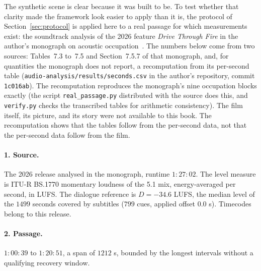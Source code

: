 The synthetic scene is clear because it was built to be. To test whether that clarity made the framework look easier to apply than it is, the protocol of Section~\ref{sec:protocol} is applied here to a real passage for which measurements exist: the soundtrack analysis of the 2026 feature \emph{Drive Through Fire} in the author's monograph on acoustic occupation~\cite{flyxion2026occupation}. The numbers below come from two sources: Tables~7.3 to~7.5 and Section~7.5.7 of that monograph, and, for quantities the monograph does not report, a recomputation from its per-second table (\texttt{audio-analysis/results/seconds.csv} in the author's repository, commit \texttt{1c016ab}). The recomputation reproduces the monograph's nine occupation blocks exactly (the script \texttt{real\_passage.py} distributed with the source does this, and \texttt{verify.py} checks the transcribed tables for arithmetic consistency). The film itself, its picture, and its story were not available to this book. The recomputation shows that the tables follow from the per-second data, not that the per-second data follow from the film.

\paragraph{1. Source.} The 2026 release analysed in the monograph, runtime $1{:}27{:}02$. The level measure is ITU-R BS.1770 momentary loudness of the 5.1 mix, energy-averaged per second, in LUFS. The dialogue reference is $D=-34.6$ LUFS, the median level of the $1499$ seconds covered by subtitles ($799$ cues, applied offset $0.0$ s). Timecodes belong to this release.

\paragraph{2. Passage.} $1{:}00{:}39$ to $1{:}20{:}51$, a span of $1212$ s, bounded by the longest intervals without a qualifying recovery window.

